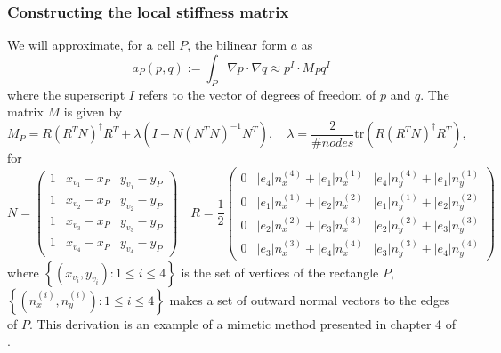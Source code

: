 \subsubsection{Constructing the local stiffness matrix}\label{Sec:NumericalScheme}
We will approximate, for a cell $P$, the bilinear form $a$ as
%
\begin{equation}
	a_P(p,q):=\int_P\nabla p\cdot\nabla q \approx p^I\cdot M_P q^I
\end{equation}
%
where the superscript $I$ refers to the vector of degrees of freedom of $p$ and $q$. The matrix $M$ is given by
%
\begin{equation}\label{eq:LocStiffnessMat}
	M_P = R(R^TN)^{\dagger}R^T+\lambda (I-N(N^TN)^{-1}N^T),\quad\lambda = \frac{2}{\# nodes}\mbox{tr}\left( R(R^TN)^{\dagger}R^T\right),
\end{equation}
%
for 
%
\begin{equation}\label{eq:NandR}
	N = \begin{pmatrix}
		1 & x_{v_1}-x_P & y_{v_1}-y_P\\ 
		1 & x_{v_2}-x_P & y_{v_2}-y_P\\ 
		1 & x_{v_3}-x_P & y_{v_3}-y_P\\ 
		1 & x_{v_4}-x_P & y_{v_4}-y_P
	\end{pmatrix}\quad
	R = \frac{1}{2}\begin{pmatrix}
		0 & |e_4| n_x^{(4)}+|e_1|n_x^{(1)} & |e_4| n_y^{(4)}+|e_1|n_y^{(1)}\\
		0 & |e_1| n_x^{(1)}+|e_2|n_x^{(2)} & |e_1| n_y^{(1)}+|e_2|n_y^{(2)}\\
		0 & |e_2| n_x^{(2)}+|e_3|n_x^{(3)} & |e_2| n_y^{(2)}+|e_3|n_y^{(3)}\\
		0 & |e_3| n_x^{(3)}+|e_4|n_x^{(4)} & |e_3| n_y^{(3)}+|e_4|n_y^{(4)}
	\end{pmatrix}
\end{equation}
%
where $\left\{\left(x_{v_i},y_{v_i}\right):1\le i\le 4\right\}$ is the set of vertices of the rectangle $P$, $\left\{\left(n_x^{(i)},n_y^{(i)}\right):1\le i\le 4\right\}$ makes a set of outward normal vectors to the edges of $P$. 
%
This derivation is an example of a mimetic method presented in chapter 4 of \cite{da2014mimetic}.


